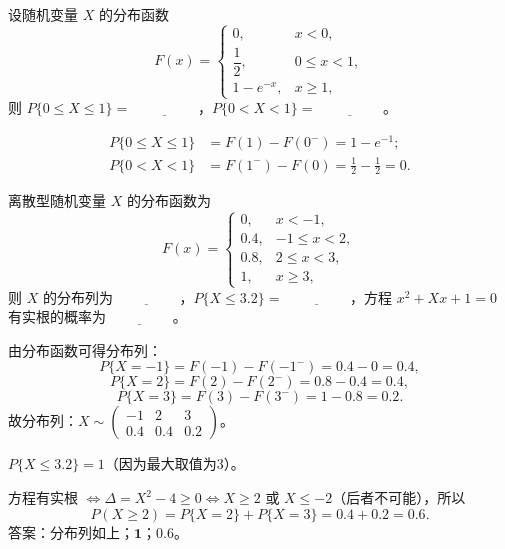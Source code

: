 ﻿\documentclass[lang=cn,11pt]{elegantbook}
\begin{document}
\begin{exercise}[分布函数计算] \label{exer:2-35}
设随机变量 $X$ 的分布函数
\[
F(x)=
\begin{cases}
0, & x<0, \\
\dfrac{1}{2}, & 0\leqslant x<1, \\
1-e^{-x}, & x\geqslant1,
\end{cases}
\]
则 $P\{0\leqslant X\leqslant1\}=\underline{\hspace{2cm}}$，$P\{0<X<1\}=\underline{\hspace{2cm}}$。
\end{exercise}

\begin{solution}
\[
\begin{aligned}
P\{0\leqslant X\leqslant1\}&=F(1)-F(0^-)=1-e^{-1}; \\
P\{0<X<1\}&=F(1^-)-F(0)=\frac{1}{2}-\frac{1}{2}=0.
\end{aligned}
\]
\end{solution}

\begin{exercise}[离散型分布求解] \label{exer:2-36}
离散型随机变量 $X$ 的分布函数为
\[
F(x)=
\begin{cases}
0, & x<-1, \\
0.4, & -1\leqslant x<2, \\
0.8, & 2\leqslant x<3, \\
1, & x\geqslant3,
\end{cases}
\]
则 $X$ 的分布列为$\underline{\hspace{2cm}}$，$P\{X\leqslant3.2\}=\underline{\hspace{2cm}}$，方程 $x^2+Xx+1=0$ 有实根的概率为$\underline{\hspace{2cm}}$。
\end{exercise}

\begin{solution}
由分布函数可得分布列：
\[
P\{X=-1\}=F(-1)-F(-1^-)=0.4-0=0.4,
\]
\[
P\{X=2\}=F(2)-F(2^-)=0.8-0.4=0.4,
\]
\[
P\{X=3\}=F(3)-F(3^-)=1-0.8=0.2.
\]
故分布列：$X\sim\begin{pmatrix}-1 & 2 & 3 \\ 0.4 & 0.4 & 0.2\end{pmatrix}$。

$P\{X\leqslant3.2\}=1$（因为最大取值为3）。

方程有实根 $\Leftrightarrow \Delta=X^2-4\geqslant0 \Leftrightarrow X\geqslant2$ 或 $X\leqslant-2$（后者不可能），所以
\[
P(X\geqslant2)=P\{X=2\}+P\{X=3\}=0.4+0.2=0.6.
\]
答案：分布列如上；$\boldsymbol{1}$；$\boldsymbol{0.6}$。
\end{solution}
\end{document}

